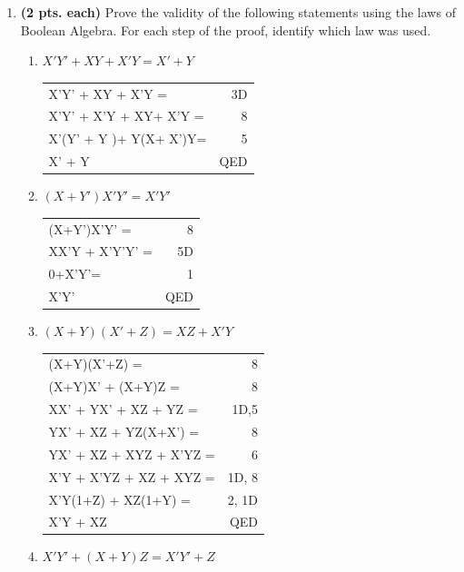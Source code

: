 \begin{enumerate}
\item  {\bf (2 pts. each)} Prove the validity of the following 
statements using the laws of Boolean Algebra. For each step of 
the proof, identify which law was used.
\begin{enumerate}
	\item $X'Y' + XY + X'Y = X' + Y$

\begin{solution}{
\begin{tabular}{lr}
X'Y' + XY + X'Y = 	& 3D\\
X'Y' + X'Y + XY+ X'Y =	& 8 \\
X'(Y' + Y )+ Y(X+ X')Y=	& 5 \\
X' + Y 			& QED \\
\end{tabular} }\end{solution}

	\item $(X+Y')X'Y' = X'Y'$

\begin{solution}{
\begin{tabular}{lr}
(X+Y')X'Y' = 	& 8 \\
XX'Y + X'Y'Y' = & 5D \\
0+X'Y'= 	& 1 \\
X'Y' 		& QED \\
\end{tabular}}\end{solution}

	\item $(X+Y)(X'+Z) = XZ + X'Y$

\begin{solution}{
\begin{tabular}{lr}
(X+Y)(X'+Z) = 		& 8 \\
(X+Y)X' + (X+Y)Z = 	& 8 \\
XX' + YX' + XZ + YZ =	& 1D,5 \\
YX' + XZ + YZ(X+X') =  	& 8 \\
YX' + XZ + XYZ + X'YZ =	& 6  \\
X'Y + X'YZ + XZ + XYZ =	& 1D, 8 \\
X'Y(1+Z) + XZ(1+Y) =  	& 2, 1D \\
X'Y + XZ 		& QED \\
\end{tabular} }\end{solution}

	\item $X'Y' + (X+Y)Z = X'Y' + Z$


\end{enumerate}
\end{enumerate}
